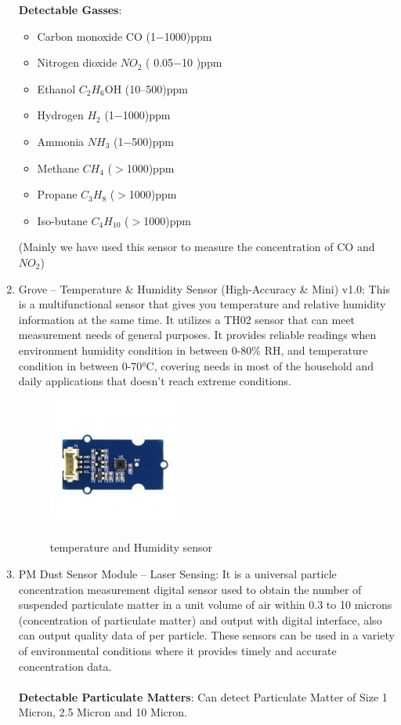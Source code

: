\begin{enumerate}
	\textbf{Detectable Gasses}:
		\begin{itemize}
			\item Carbon monoxide CO (1$-$1000)ppm
			\item Nitrogen dioxide $NO_2$ ( 0.05$-$10 )ppm
			\item Ethanol $C_2H_6$OH (10$–$500)ppm
			\item Hydrogen $H_2$ (1$-$1000)ppm
			\item Ammonia $NH_3$ (1$-$500)ppm
			\item Methane $CH_4$ ($>$1000)ppm
			\item Propane $C_3H_8$ ($>$1000)ppm
			\item Iso-butane $C_4H_{10}$ ($>$1000)ppm
		\end{itemize}
	(Mainly we have used this sensor to measure the concentration of CO and $NO_2$)
	\item Grove – Temperature \& Humidity Sensor (High-Accuracy \& Mini) v1.0: This is a multifunctional sensor that gives you temperature and relative humidity information at the same time. It utilizes a TH02 sensor that can meet measurement needs of general purposes. It provides reliable readings when environment humidity condition in between 0-80\% RH, and temperature condition in between 0-70°C, covering needs in most of the household and daily applications that doesn't reach extreme conditions.
	\\
	\begin{figure}[h]
	\centering
	\includegraphics[width=0.4\textwidth]{./temp}\\[0.1in]
	\label{fig:temperature and Humidity sensor}
	\caption{temperature and Humidity sensor}
	\end{figure}
	
	\item PM Dust Sensor Module – Laser Sensing: It is a universal particle concentration measurement digital sensor used to obtain the number of suspended particulate matter in a unit volume of air within 0.3 to 10 microns (concentration of particulate matter) and output with digital interface, also can output quality data of per particle. These sensors can be used in a variety of environmental conditions where it provides timely and accurate concentration data.
\\
\\
	\textbf{Detectable Particulate Matters}: Can detect Particulate Matter of Size 1 Micron, 2.5 Micron and 10 Micron.
\end{enumerate}

